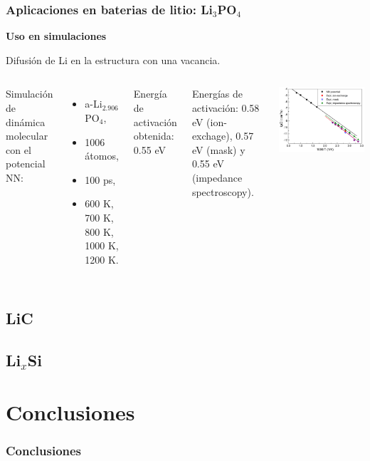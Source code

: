 \documentclass[aspectratio=169]{beamer}
\let\oldtextbf\textbf
\renewcommand{\textbf}[1]{\textcolor{nordblue}{\oldtextbf{#1}}}
\begin{document}
    \begin{frame}
        \frametitle{Aplicaciones en baterias de litio: Li$_3$PO$_4$}
            
        \textbf{Uso en simulaciones}

        Difusión de Li en la estructura con una vacancia.
        
        \begin{columns}
            Simulación de dinámica molecular con el potencial NN:
            \begin{itemize}
                \item a-Li$_{2.906}$PO$_4$,
                \item 1006 átomos,
                \item 100 ps,
                \item 600 K, 700 K, 800 K, 1000 K, 1200 K.
            \end{itemize}

            Energía de activación obtenida: 0.55 eV

            Energías de activación: 0.58 eV (ion-exchage), 0.57 eV (mask) y
            0.55 eV (impedance spectroscopy).
            \begin{center}
                \includegraphics[width=\columnwidth]{Li3PO4-MD-arrhenius.png}
            \end{center}
        \end{columns}

    \end{frame}

    \subsection{LiC}
    \subsection{Li$_x$Si}
    
    \section{Conclusiones}

    \begin{frame}
        \frametitle{Conclusiones}
    \end{frame}
\end{document}
